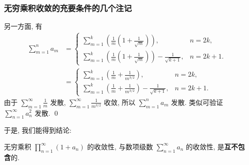 \begin{frame}
\frametitle{无穷乘积收敛的充要条件的几个注记}

另一方面, 有
\vspace{-1em}
{
\smaller[1]
\begin{align*}
\sum_{m=1}^n a_m & = \begin{cases}
\sum_{m=1}^{k} \left( \frac{1}{m} \left( 1 + \frac{1}{\sqrt{m}} \right) \right), & n = 2k, \\
\sum_{m=1}^{k} \left( \frac{1}{m} \left( 1 + \frac{1}{\sqrt{m}} \right) \right) - \frac{1}{\sqrt{k+1}} , & n = 2k+1.
\end{cases} \\
& = \begin{cases}
\sum_{m=1}^{k} \left( \frac{1}{m} + \frac{1}{m^{3/2}} \right), & n = 2k, \\
\sum_{m=1}^{k} \left( \frac{1}{m} + \frac{1}{m^{3/2}} \right) - \frac{1}{\sqrt{k+1}} , & n = 2k+1.
\end{cases}
\end{align*}
}
\pause
由于 $\sum_{m=1}^\infty \frac{1}{m}$ 发散, $\sum_{m=1}^\infty \frac{1}{m^{3/2}}$ 收敛, 所以 $\sum_{m=1}^n a_m$ 发散.
\pause
类似可验证 $\sum_{n=1}^\infty a_n^2$ 发散.
\qed

\pause

于是, 我们能得到结论:
\begin{attnblock}
无穷乘积 $\prod_{n=1}^\infty (1 + a_n)$ 的收敛性, 与数项级数 $\sum_{n=1}^\infty a_n$ 的收敛性, 是\textbf{互不包含}的.
\end{attnblock}

\end{frame}


